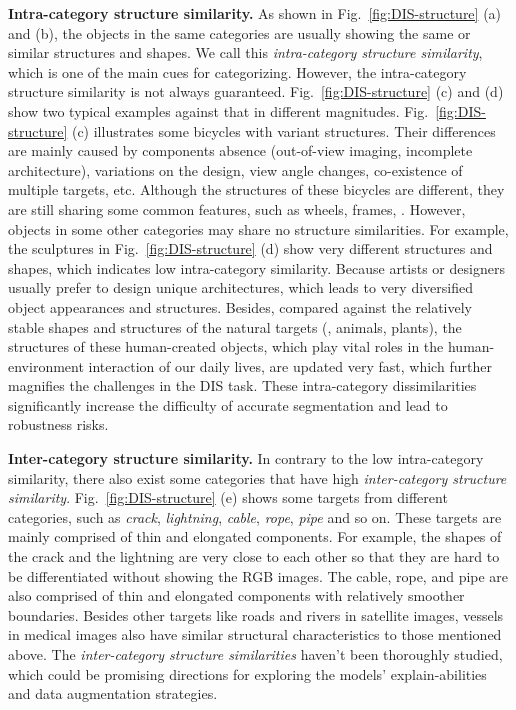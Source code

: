 \documentclass[10pt,twocolumn,letterpaper]{article}
\begin{document}
\noindent 
\textbf{Intra-category structure similarity.}
As shown in Fig.~\ref{fig:DIS-structure} (a) and (b), the objects in the same categories are usually showing the same or similar structures and shapes. We call this \textit{intra-category structure similarity}, which is one of the main cues for categorizing. However, the intra-category structure similarity is not always guaranteed. Fig.~\ref{fig:DIS-structure} (c) and (d) show two typical examples against that in different magnitudes. Fig.~\ref{fig:DIS-structure} (c) illustrates some bicycles with variant structures. 
Their differences are mainly caused by components absence (out-of-view imaging, incomplete architecture), variations on the design, view angle changes, co-existence of multiple targets, etc. 
Although the structures of these bicycles are different, they are still sharing some common features, such as wheels, frames, \etc. 
However, objects in some other categories may share no structure similarities. 
For example, the sculptures in Fig.~\ref{fig:DIS-structure} (d) show very different structures and shapes, which indicates low intra-category similarity. 
Because artists or designers usually prefer to design unique architectures, which leads to very diversified object appearances and structures. 
Besides, compared against the relatively stable shapes and structures of the natural targets (\eg, animals, plants), the structures of these human-created objects, which play vital roles in the human-environment interaction of our daily lives, are updated very fast, which further magnifies the challenges in the DIS task. These intra-category dissimilarities significantly increase the difficulty of accurate segmentation and lead to robustness risks. 

\noindent 
\textbf{Inter-category structure similarity.}
In contrary to the low intra-category similarity, there also exist some categories that have high \textit{inter-category structure similarity}. 
Fig.~\ref{fig:DIS-structure} (e) shows some targets from different categories, such as \textit{crack}, \textit{lightning}, \textit{cable}, \textit{rope}, \textit{pipe} and so on. 
These targets are mainly comprised of thin and elongated components. 
For example, the shapes of the crack and the lightning are very close to each other so that they are hard to be differentiated without showing the RGB images. 
The cable, rope, and pipe are also comprised of thin and elongated components with relatively smoother boundaries. 
Besides other targets like roads and rivers in satellite images, vessels in medical images also have similar structural characteristics to those mentioned above. The \textit{inter-category structure similarities} haven't been thoroughly studied, which could be promising directions for exploring the models' explain-abilities and data augmentation strategies. 
\end{document}
